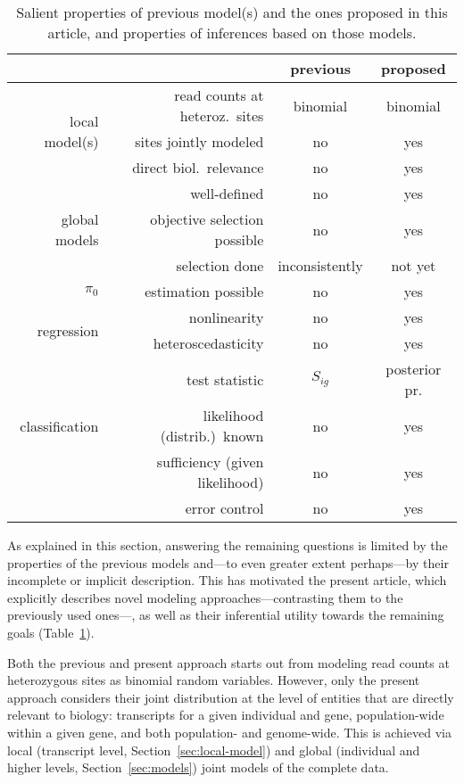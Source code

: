 \documentclass[letterpaper]{article}
\begin{document}
\begin{table}[t]
\begin{tabular}{rr|cc}
& & previous & proposed \\
\hline
\hline
\multirow{3}{*}{local model(s)} & read counts at heteroz.~sites & binomial &
binomial\\
& sites jointly modeled & no & yes \\
& direct biol.~relevance & no & yes \\
\hline
\multirow{3}{*}{global models} & well-defined & no & yes \\
& objective selection possible & no & yes \\
& selection done & inconsistently & not yet \\
\hline
\multirow{1}{*}{\(\pi_0\) } & estimation possible & no & yes \\
\hline
\multirow{2}{*}{regression} & nonlinearity & no & yes \\
& heteroscedasticity & no & yes\\
\hline
\multirow{3}{*}{classification} & test statistic & \(S_{ig}\) & posterior
pr. \\
& likelihood (distrib.)~known & no & yes \\
& sufficiency (given likelihood) & no & yes \\
& error control & no & yes \\
\hline
\end{tabular}
\caption{
Salient properties of previous model(s) and the ones proposed in this article,
and properties of inferences based on those models.
}
\label{tab:previous-proposed}
\end{table}

As explained in this section, answering the remaining questions is limited by
the properties of the previous models and---to even greater extent
perhaps---by their incomplete or implicit description.  This has motivated the
present article, which explicitly describes novel modeling
approaches---contrasting them to the previously used ones---, as well as their
inferential utility towards the remaining goals
(Table~\ref{tab:previous-proposed}).

Both the previous and present approach starts out from modeling read counts at
heterozygous sites as binomial random variables.  However, only the present
approach considers their joint distribution at the level of entities that are
directly relevant to biology: transcripts for a given individual and gene,
population-wide within a given gene, and both population- and genome-wide.
This is achieved via local (transcript level, Section~\ref{sec:local-model})
and global (individual and higher levels, Section~\ref{sec:models}) joint
models of the complete data.
\end{document}
